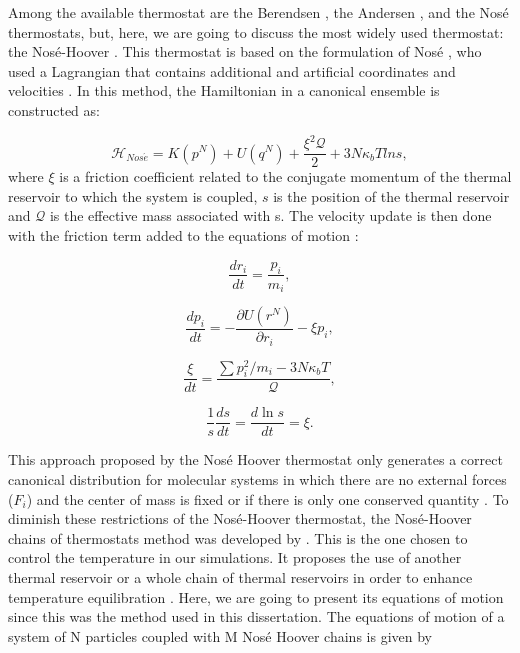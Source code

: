 Among the available thermostat are the Berendsen \cite{doi:10.1063/1.448118}, the Andersen \cite{1980JChPh722384A}, and the Nos\'{e} \cite{1984JChPh81511N} thermostats, but, here, we are going to discuss the most widely used thermostat: the Nosé-Hoover \cite{PhysRevA.31.1695}. This thermostat is based on the formulation of Nosé \cite{1984JChPh81511N}, who used a Lagrangian that contains additional and artificial coordinates and velocities \cite{frenkel}. In this method, the Hamiltonian in a canonical ensemble is constructed as:

\begin{equation}
\mathcal{H}_{Nos\acute{e}} =  K(p^{N}) + U(q^{N})  + \frac{\xi ^{2} \mathcal{Q}}{2} + 3N\kappa_{b}T ln s ,
\end{equation}
where $\xi$ is a friction coefficient related to the conjugate momentum of the thermal reservoir to which the system is coupled, $s$ is the position of the thermal reservoir and $\mathcal{Q}$ is the effective mass associated with s. The velocity update is then done with the friction term added to the equations of motion \cite{shell2015}:

\begin{equation}
\frac{dr_{i}}{dt} = \frac{p_i}{m_i},
\end{equation}

\begin{equation}
\frac{dp_{i}}{dt} = -  \frac{\partial U (r^{N})}{\partial r_{i}} - \xi p_{i},
\end{equation}

\begin{equation}
\frac{\xi}{dt} = \frac{\sum p_{i}^{2}/m_{i} - 3N\kappa_{b}T}{\mathcal{Q}} ,
\end{equation}

\begin{equation}
\frac{1}{s}\frac{ds}{dt} =\frac{d \ln s}{dt} = \xi.
\end{equation}

This approach proposed by the Nos\'{e} Hoover thermostat only generates a correct canonical distribution for molecular systems in which there are no external forces ($F_{i}$) and the center of mass is fixed or if there is only one conserved quantity \cite{frenkel}. To diminish these restrictions of the Nosé-Hoover thermostat, the Nosé-Hoover chains of thermostats method was developed by . This is the one chosen to control the temperature in our simulations. It proposes the use of another thermal reservoir or a whole chain of thermal reservoirs in order to enhance temperature equilibration \cite{shell2015}. Here, we are going to present its equations of motion since this was the method used in this dissertation. The equations of motion of a system of N particles coupled with M Nos\'{e} Hoover chains is given by

